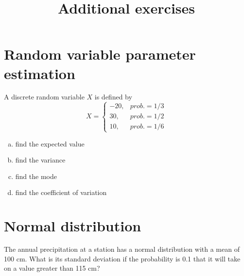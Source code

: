 \documentclass[12pt]{article}
\date{}
\begin{document}

\title{Additional exercises}

\maketitle 


\section{Random variable parameter estimation}

A discrete random variable $X$ is defined by
  \begin{equation}
    X=
    \begin{cases}
      -20, & prob.=1/3 \\
       30, & prob.=1/2 \\
       10, & prob.=1/6
    \end{cases}
  \end{equation}

\begin{enumerate}[(a)] 
\item find the expected value
\item find the variance
\item find the mode
\item find the coefficient of variation
\end{enumerate}

\section{Normal distribution}
The annual precipitation at a station has a normal distribution with a mean of 100 cm. What is its standard deviation if the probability is 0.1 that it will take on a value greater than 115 cm?
\end{document}
